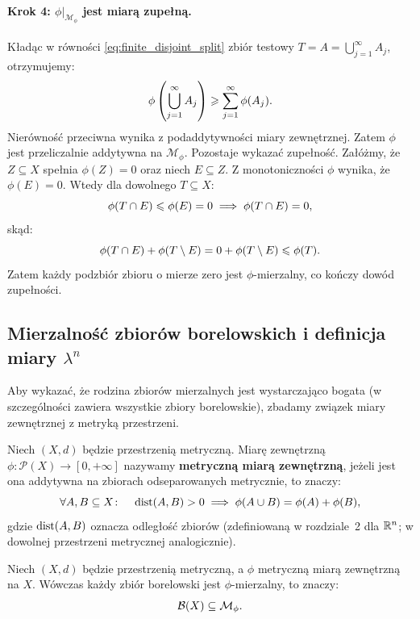 \begin{dow}
    \paragraph{Krok 4: $\phi|_{\mathcal{M}_\phi}$ jest miarą zupełną.}
    Kładąc w równości \eqref{eq:finite_disjoint_split} zbiór testowy $T = A = \bigcup_{j=1}^\infty A_j$, otrzymujemy:
    \begin{equation*}
        \phi\left(\bigcup_{j=1}^\infty A_j\right) \geqslant \sum_{j=1}^\infty \phi(A_j).
    \end{equation*}
    Nierówność przeciwna wynika z podaddytywności miary zewnętrznej. Zatem $\phi$ jest przeliczalnie addytywna na $\mathcal{M}_\phi$. Pozostaje wykazać zupełność. Załóżmy, że $Z \subseteq X$ spełnia $\phi(Z) = 0$ oraz niech $E \subseteq Z$. Z monotoniczności $\phi$ wynika, że $\phi(E) = 0$. Wtedy dla dowolnego $T \subseteq X$:
    \begin{equation*}
        \phi(T \cap E) \leqslant \phi(E) = 0 \implies \phi(T \cap E) = 0,
    \end{equation*} skąd:
    \begin{equation*}
        \phi(T \cap E) + \phi(T \setminus E) = 0 + \phi(T \setminus E) \leqslant \phi(T).
    \end{equation*}
    Zatem każdy podzbiór zbioru o mierze zero jest $\phi$-mierzalny, co kończy dowód zupełności.
\end{dow}
\subsection{Mierzalność zbiorów borelowskich i definicja miary $\lambda^n$}
Aby wykazać, że rodzina zbiorów mierzalnych jest wystarczająco bogata (w szczególności zawiera wszystkie zbiory borelowskie), zbadamy związek miary zewnętrznej z metryką przestrzeni.
\begin{defi}
    Niech $(X, d)$ będzie przestrzenią metryczną. Miarę zewnętrzną $\phi \colon \mathcal{P}(X) \to [0, +\infty]$ nazywamy \textbf{metryczną miarą zewnętrzną}, jeżeli jest ona addytywna na zbiorach odseparowanych metrycznie, to znaczy:
    \begin{equation*}
        \forall A, B \subseteq X \colon \quad \operatorname{dist}(A, B) > 0 \implies \phi(A \cup B) = \phi(A) + \phi(B),
    \end{equation*}
    gdzie $\operatorname{dist}(A, B)$ oznacza odległość zbiorów (zdefiniowaną w rozdziale~2 dla $\mathbb{R}^{n}$; w dowolnej przestrzeni metrycznej analogicznie).
\end{defi}
\begin{tw}\label{tw:metric_borel}
    Niech $(X, d)$ będzie przestrzenią metryczną, a $\phi$ metryczną miarą zewnętrzną na $X$. Wówczas każdy zbiór borelowski jest $\phi$-mierzalny, to znaczy:
    \begin{equation*}
        \mathcal{B}({X}) \subseteq \mathcal{M}_\phi.
    \end{equation*}
\end{tw}

